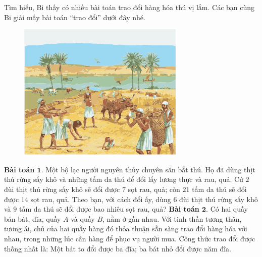 	\vskip 0.1cm
	Tìm hiểu, Bi thấy có nhiều bài toán trao đổi hàng hóa thú vị lắm. Các bạn cùng Bi giải mấy bài toán “trao đổi” dưới đây nhé.
	\vskip 0.1cm
	\begin{figure}
		\centering
		\vspace*{-15pt}
		\captionsetup{labelformat= empty, justification=centering}
		\includegraphics[width=1\linewidth]{pic2}
		\vspace*{-25pt}
	\end{figure}	
	\textbf{\color{toancuabi}Bài toán $\pmb{1.}$} Một bộ lạc người nguyên thủy chuyên săn bắt thú. Họ đã dùng thịt thú rừng sấy khô và những tấm da thú để đổi lấy lương thực và rau, quả. Cứ $2$ đùi thịt thú rừng sấy khô sẽ đổi được $7$ sọt rau, quả; còn $21$ tấm da thú sẽ đổi được $14$ sọt rau, quả. Theo bạn, với cách đổi ấy, dùng $6$ đùi thịt thú rừng sấy khô và $9$ tấm da thú sẽ đổi được bao nhiêu sọt rau, quả?
	\vskip 0.15cm
	\textbf{\color{toancuabi}Bài toán $\pmb{2.}$} Có hai quầy bán bát, đĩa, quầy $A$ và quầy $B$, nằm ở gần nhau. Với tinh thần tương thân, tương ái, chủ của hai quầy hàng đó thỏa thuận sẵn sàng trao đổi hàng hóa với nhau, trong những lúc cần hàng để phục vụ người mua. Công thức trao đổi được thống nhất là: Một bát to đổi được ba đĩa; ba bát nhỏ đổi được năm đĩa.
	\vskip 0.1cm
